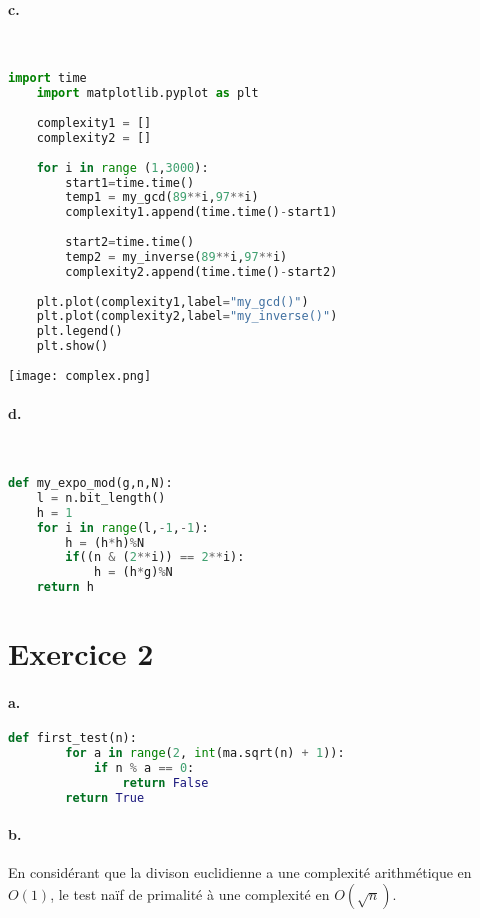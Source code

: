 \documentclass[french]{article}
\begin{document}
\paragraph{c.} \*\\
\begin{lstlisting}[language=Python, belowskip=-1 \baselineskip]
    import time
    import matplotlib.pyplot as plt
    
    complexity1 = []
    complexity2 = []
    
    for i in range (1,3000):
        start1=time.time()
        temp1 = my_gcd(89**i,97**i)
        complexity1.append(time.time()-start1)
    
        start2=time.time()
        temp2 = my_inverse(89**i,97**i)
        complexity2.append(time.time()-start2)
    
    plt.plot(complexity1,label="my_gcd()")
    plt.plot(complexity2,label="my_inverse()")
    plt.legend()
    plt.show()
\end{lstlisting}
\begin{center}
\texttt{[image: complex.png]}
\end{center}
\paragraph{d.} \
\begin{lstlisting}[language=Python, belowskip=-1 \baselineskip]
def my_expo_mod(g,n,N):
    l = n.bit_length()
    h = 1
    for i in range(l,-1,-1):
        h = (h*h)%N
        if((n & (2**i)) == 2**i):
            h = (h*g)%N
    return h
\end{lstlisting}
\section*{Exercice 2}
\paragraph{a.}  
\begin{center}
\begin{lstlisting}[language=Python, belowskip=-1 \baselineskip]
    def first_test(n):
        for a in range(2, int(ma.sqrt(n) + 1)):
            if n % a == 0:
                return False
        return True
\end{lstlisting}
\end{center}
\paragraph{b.} En considérant que la divison euclidienne a une complexité arithmétique en $O(1)$, le test naïf de primalité à une complexité en $O(\sqrt{n})$.
\end{document}
